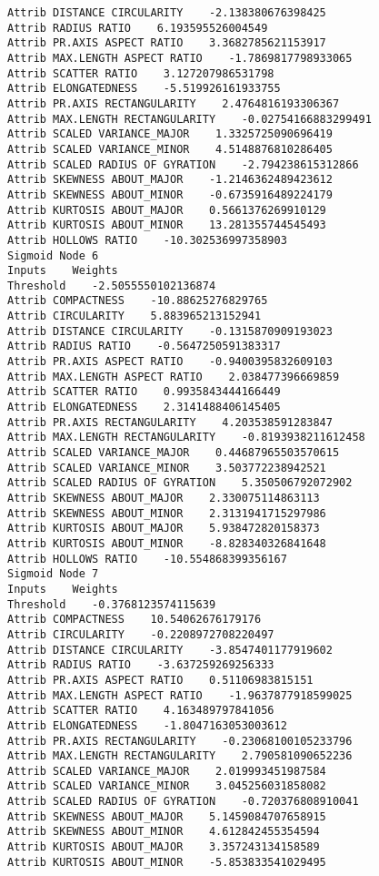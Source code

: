 \documentclass[
	article,			%
	11pt,				%
	oneside,			%
	a4paper,			%
	english,			%
	brazil,				%
	sumario=tradicional
	]{abntex2}
\begin{document}
\begin{lstlisting}
Attrib DISTANCE CIRCULARITY    -2.138380676398425
Attrib RADIUS RATIO    6.193595526004549
Attrib PR.AXIS ASPECT RATIO    3.3682785621153917
Attrib MAX.LENGTH ASPECT RATIO    -1.7869817798933065
Attrib SCATTER RATIO    3.127207986531798
Attrib ELONGATEDNESS    -5.519926161933755
Attrib PR.AXIS RECTANGULARITY    2.4764816193306367
Attrib MAX.LENGTH RECTANGULARITY    -0.02754166883299491
Attrib SCALED VARIANCE_MAJOR    1.3325725090696419
Attrib SCALED VARIANCE_MINOR    4.5148876810286405
Attrib SCALED RADIUS OF GYRATION    -2.794238615312866
Attrib SKEWNESS ABOUT_MAJOR    -1.2146362489423612
Attrib SKEWNESS ABOUT_MINOR    -0.6735916489224179
Attrib KURTOSIS ABOUT_MAJOR    0.5661376269910129
Attrib KURTOSIS ABOUT_MINOR    13.281355744545493
Attrib HOLLOWS RATIO    -10.302536997358903
Sigmoid Node 6
Inputs    Weights
Threshold    -2.5055550102136874
Attrib COMPACTNESS    -10.88625276829765
Attrib CIRCULARITY    5.883965213152941
Attrib DISTANCE CIRCULARITY    -0.1315870909193023
Attrib RADIUS RATIO    -0.5647250591383317
Attrib PR.AXIS ASPECT RATIO    -0.9400395832609103
Attrib MAX.LENGTH ASPECT RATIO    2.038477396669859
Attrib SCATTER RATIO    0.9935843444166449
Attrib ELONGATEDNESS    2.3141488406145405
Attrib PR.AXIS RECTANGULARITY    4.203538591283847
Attrib MAX.LENGTH RECTANGULARITY    -0.8193938211612458
Attrib SCALED VARIANCE_MAJOR    0.44687965503570615
Attrib SCALED VARIANCE_MINOR    3.503772238942521
Attrib SCALED RADIUS OF GYRATION    5.350506792072902
Attrib SKEWNESS ABOUT_MAJOR    2.330075114863113
Attrib SKEWNESS ABOUT_MINOR    2.3131941715297986
Attrib KURTOSIS ABOUT_MAJOR    5.938472820158373
Attrib KURTOSIS ABOUT_MINOR    -8.828340326841648
Attrib HOLLOWS RATIO    -10.554868399356167
Sigmoid Node 7
Inputs    Weights
Threshold    -0.3768123574115639
Attrib COMPACTNESS    10.54062676179176
Attrib CIRCULARITY    -0.2208972708220497
Attrib DISTANCE CIRCULARITY    -3.8547401177919602
Attrib RADIUS RATIO    -3.637259269256333
Attrib PR.AXIS ASPECT RATIO    0.51106983815151
Attrib MAX.LENGTH ASPECT RATIO    -1.9637877918599025
Attrib SCATTER RATIO    4.163489797841056
Attrib ELONGATEDNESS    -1.8047163053003612
Attrib PR.AXIS RECTANGULARITY    -0.23068100105233796
Attrib MAX.LENGTH RECTANGULARITY    2.790581090652236
Attrib SCALED VARIANCE_MAJOR    2.019993451987584
Attrib SCALED VARIANCE_MINOR    3.045256031858082
Attrib SCALED RADIUS OF GYRATION    -0.720376808910041
Attrib SKEWNESS ABOUT_MAJOR    5.1459084707658915
Attrib SKEWNESS ABOUT_MINOR    4.612842455354594
Attrib KURTOSIS ABOUT_MAJOR    3.357243134158589
Attrib KURTOSIS ABOUT_MINOR    -5.853833541029495

\end{lstlisting}
\end{document}
